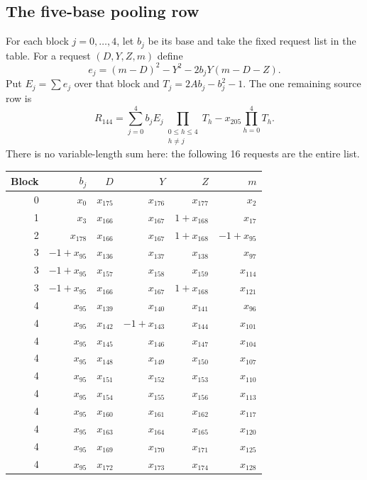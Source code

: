\subsection{The five-base pooling row}
For each block $j=0,\ldots,4$, let $b_j$ be its base and take the fixed request list in the table. For a request $(D,Y,Z,m)$ define
\[
e_{j}= (m-D)^2-Y^2-2b_jY(m-D-Z).
\]
Put $E_j=\sum e_j$ over that block and $T_j=2Ab_j-b_j^2-1$. The one remaining source row is
\[
R_{144}=\sum_{j=0}^{4}b_jE_j\prod_{\substack{0\le h\le4\\h\ne j}}T_h
-x_{205}\prod_{h=0}^{4}T_h.
\]
There is no variable-length sum here: the following 16 requests are the entire list.
\begin{center}\small\begin{tabular}{rrrrrr}\toprule
Block&$b_j$&$D$&$Y$&$Z$&$m$\\\midrule
0&$x_{0}$&$x_{175}$&$x_{176}$&$x_{177}$&$x_{2}$\\
1&$x_{3}$&$x_{166}$&$x_{167}$&$1+x_{168}$&$x_{17}$\\
2&$x_{178}$&$x_{166}$&$x_{167}$&$1+x_{168}$&$-1+x_{95}$\\
3&$-1+x_{95}$&$x_{136}$&$x_{137}$&$x_{138}$&$x_{97}$\\
3&$-1+x_{95}$&$x_{157}$&$x_{158}$&$x_{159}$&$x_{114}$\\
3&$-1+x_{95}$&$x_{166}$&$x_{167}$&$1+x_{168}$&$x_{121}$\\
4&$x_{95}$&$x_{139}$&$x_{140}$&$x_{141}$&$x_{96}$\\
4&$x_{95}$&$x_{142}$&$-1+x_{143}$&$x_{144}$&$x_{101}$\\
4&$x_{95}$&$x_{145}$&$x_{146}$&$x_{147}$&$x_{104}$\\
4&$x_{95}$&$x_{148}$&$x_{149}$&$x_{150}$&$x_{107}$\\
4&$x_{95}$&$x_{151}$&$x_{152}$&$x_{153}$&$x_{110}$\\
4&$x_{95}$&$x_{154}$&$x_{155}$&$x_{156}$&$x_{113}$\\
4&$x_{95}$&$x_{160}$&$x_{161}$&$x_{162}$&$x_{117}$\\
4&$x_{95}$&$x_{163}$&$x_{164}$&$x_{165}$&$x_{120}$\\
4&$x_{95}$&$x_{169}$&$x_{170}$&$x_{171}$&$x_{125}$\\
4&$x_{95}$&$x_{172}$&$x_{173}$&$x_{174}$&$x_{128}$\\
\bottomrule\end{tabular}\end{center}
